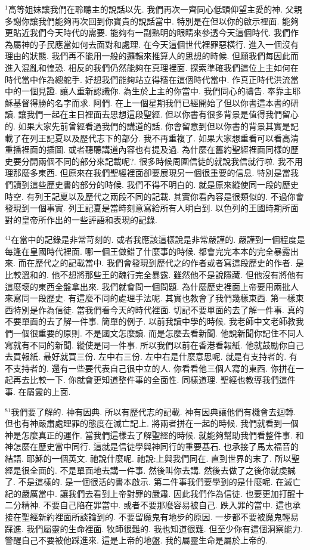 \documentclass{book}
\begin{document}
$^{1}$高等姐妹讓我們在聆聽主的說話以先.
我們再次一齊同心低頭仰望主愛的神.
父親多謝你讓我們能夠再次回到你寶貴的說話當中.
特別是在但以你的啟示裡面.
能夠更貼近我們今天時代的需要.
能夠有一副熟明的眼睛來參透今天這個時代.
我們作為屬神的子民應當如何去面對和處理.
在今天這個世代裡罪惡橫行.
進入一個沒有理由的狀態.
我們再不能用一般的邏輯來推算人的思想的時候.
但願我們每因此而進入混亂和惶恐.
相反的我們仍然能夠在真理裡面.
探索準確我們這位上主如何在時代當中作為總舵手.
好想我們能夠站立得穩在這個時代當中.
作真正時代洪流當中的一個見證.
讓人重新認識你.
為生於上主的你當中.
我們同心的禱告.
奉靠主耶穌基督得勝的名字而求.
阿們.
在上一個星期我們已經開始了但以你書這本書的研讀.
讓我們一起在主日裡面去思想這段聖經.
但以你書有很多背景是值得我們留心的.
如果大家先前曾經看過我們的講道的話.
你會留意到但以你書的背景其實是記載了在列王記夏以及歷代志下的部分.
我不再重複了.
如果大家想重看可以看高清重播裡面的插圖.
或者聽聽講道內容也有提及過.
為什麼在舊約聖經裡面同樣的歷史要分開兩個不同的部分來記載呢?.
很多時候周圍信徒的就說我信就行啦.
我不用理那麼多東西.
但原來在我們聖經裡面卻要展現另一個很重要的信息.
特別是當我們讀到這些歷史書的部分的時候.
我們不得不明白的.
就是原來縱使同一段的歷史時空.
有列王記夏以及歷代之兩段不同的記載.
其實你看內容是很類似的.
不過你會發現到一個事實.
列王記夏是當時刻意寫給所有人明白到.
以色列的王國時期所面對的皇帝所作出的一些評語和表現的記錄.

$^{41}$在當中的記錄是非常苛刻的.
或者我應該這樣說是非常嚴謹的.
嚴謹到一個程度是每逢在皇國時代裡面.
哪一個王做錯了什麼事的時候.
都會完完本本的完全暴露出來.
而在歷代之的記載當中.
我們會發現到歷代之的作者或者寫這段歷史的作者.
是比較溫和的.
他不想將那些王的醜行完全暴露.
雖然他不是說隱藏.
但他沒有將他有這麼壞的東西全盤拿出來.
我們就會問一個問題.
為什麼歷史裡面上帝要用兩批人來寫同一段歷史.
有這麼不同的處理手法呢.
其實也教會了我們幾樣東西.
第一樣東西特別是作為信徒.
當我們看今天的時代裡面.
切記不要單面的去了解一件事.
真的不要單面的去了解一件事.
簡單的例子.
以前我讀中學的時候.
我老師中文老師教我們一個很重要的原則.
不是國文怎麼讀.
而是怎麼去看新聞.
他說新聞你記住不同人寫就有不同的新聞.
縱使是同一件事.
所以我們以前在香港看報紙.
他就鼓勵你自己去買報紙.
最好就買三份.
左中右三份.
左中右是什麼意思呢.
就是有支持者的.
有不支持者的.
還有一些要代表自己很中立的人.
你看看他三個人寫的東西.
你拼在一起再去比較一下.
你就會更知道整件事的全面性.
同樣道理.
聖經也教導我們這件事.
在屬靈的上面.

$^{81}$我們要了解的.
神有因典.
所以有歷代志的記載.
神有因典讓他們有機會去迴轉.
但也有神嚴肅處理罪的態度在滅亡記上.
將兩者拼在一起的時候.
我們就看到一個神是怎麼真正的運作.
當我們這樣去了解聖經的時候.
就能夠幫助我們看整件事.
和神怎麼在歷史當中同行.
這就是信徒學與神同行的重要基石.
也承接了馬太福音的結語.
耶穌的一個英文.
祂說什麼呢.
祂說:上與我們同在.
直到世界的末了.
所以聖經是很全面的.
不是單面地去講一件事.
然後叫你去講.
然後去做了之後你就虔誠了.
不是這樣的.
是一個很活的書本啟示.
第二件事我們要學到的是什麼呢.
在滅亡紀的嚴厲當中.
讓我們去看到上帝對罪的嚴肅.
因此我們作為信徒.
也要更加打醒十二分精神.
不要自己陷在罪當中.
或者不要那麼容易被自己.
跌入罪的當中.
這也承接在聖經新約裡面所談論到的.
不要留魔鬼有地步的原因.
一步都不要被魔鬼輕易踩進.
我們屬靈的生命裡面.
牧師很難的.
我也知道很難.
但至少你有這個洞察能力.
警醒自己不要被他踩進來.
這是上帝的地盤.
我的屬靈生命是屬於上帝的.
\end{document}
